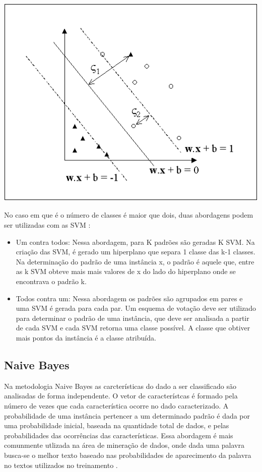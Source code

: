 \begin{center}
	\includegraphics[scale=0.5]{graficos/SVM2}
	\label{img:svm2}
\end{center}

No caso em que é o número de classes é maior que dois, duas abordagens podem ser utilizadas com as SVM \cite{Lorena03SVM}:
\begin{itemize}
\item{Um contra todos: }Nessa abordagem, para K padrões são geradas K SVM. Na criação das SVM, é gerado um hiperplano que separa 1 classe das k-1 classes. Na determinação do padrão de uma instância x, o padrão é aquele que, entre as k SVM obteve mais mais valores de x do lado do hiperplano onde se encontrava o padrão k.  
\item{Todos contra um: }Nessa abordagem os padrões são agrupados em pares e uma SVM é gerada para cada par. Um esquema de votação deve ser utilizado para determinar o padrão de uma instância, que deve ser analisada a partir de cada SVM e cada SVM retorna uma classe possível. A classe que obtiver mais pontos da instância é a classe atribuída.
\end{itemize}

\subsection{Naive Bayes}
Na metodologia Naive Bayes as carcterísticas do dado a ser classificado são analisadas de forma independente. O vetor de característcas é formado pela número de vezes que cada característica ocorre no dado caracterizado. A probabilidade de uma instância pertencer a um determinado padrão é dada por uma probabilidade inicial, baseada na quantidade total de dados, e pelas probabilidades das ocorrências das características. Essa abordagem é mais comunmente utlizada na área de mineração de dados, onde dada uma palavra busca-se o melhor texto baseado nas probabilidades de aparecimento da palavra no textos utilizados no treinamento \cite{McCallum98Bayes}\cite{Langley92Bayes}.

